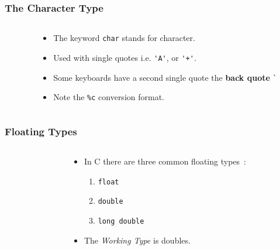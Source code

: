 \begin{frame}[fragile]
\frametitle{The Character Type}

\begin{columns}
\begin{column}{0.55\textwidth}

\end{column}

\pause
\begin{column}{0.45\textwidth}
\begin{itemize}[<+->]
\item The  keyword \verb+char+ stands for character.
\item Used with single quotes i.e.
\verb^'A'^, or \verb^'+'^.
\item Some keyboards have a second single quote the {\bf back quote} \verb^`^
\item Note the \verb+%c+ conversion format.
\end{itemize}
\end{column}

\end{columns}
\end{frame}


\begin{frame}[fragile]
\frametitle{Floating Types}
\begin{columns}
\begin{column}{0.55\textwidth}

\end{column}

\pause
\begin{column}{0.45\textwidth}
\begin{itemize}[<+->]
\item In C there are three common floating types~:
    \begin{enumerate}[<+->]
        \item \verb+float+
        \item \verb+double+
        \item \verb+long double+
    \end{enumerate}
\item The {\it Working Type} is doubles.
\end{itemize}
\end{column}

\end{columns}
\end{frame}


